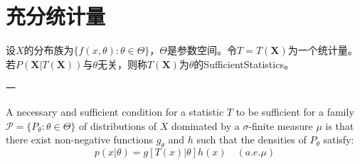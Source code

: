 \section{充分统计量}

\begin{definition}
	设$X$的分布族为$\{f(x,\theta):\theta\in\Theta\}$，$\Theta$是参数空间。令$T=T(\mathbf{X})$为一个统计量。若$P(\mathbf{X}|T(\mathbf{X}))$与$\theta$无关，则称$T(\mathbf{X})$为$\theta$的\gls{SufficientStatistics}。
\end{definition}
一
\begin{theorem}
	\label{theo:FactorizationTheorem}
	A necessary and sufficient condition for a statistic $T$ to be sufficient for a family $\mathcal{P}=\{P_\theta:\theta\in\Theta\}$ of distributions of $X$ dominated by a $\sigma$-finite measure $\mu$ is that there exist non-negative functions $g_\theta$ and $h$ such that the densities of $P_\theta$ satisfy:
	\begin{equation*}
		p(x|\theta)=g[T(x)|\theta]h(x)\quad(a.e.\mu)
	\end{equation*}
\end{theorem}